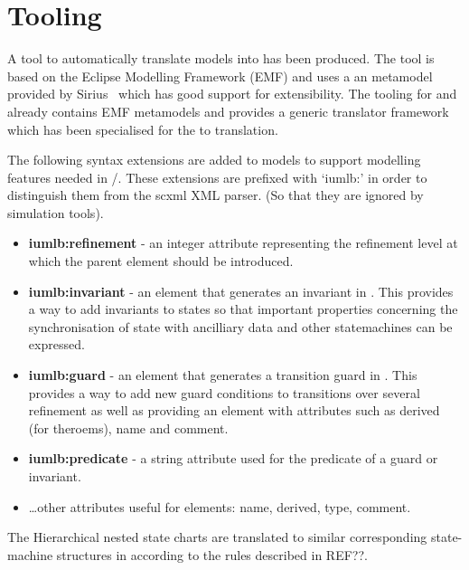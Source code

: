
\section{Tooling}
\label{sec:tooling}


A tool to automatically translate \SCXML models into \iUMLB has been produced. The tool is based on the Eclipse Modelling Framework (EMF) and uses a an \SCXML metamodel provided by Sirius~\cite{siriuswebsite} which has good support for extensibility. The tooling for \iUMLB and \EventB already contains EMF metamodels and provides a generic translator framework which has been specialised for the \SCXML to \iUMLB translation.  
 
The following syntax extensions are added to \SCXML models to support modelling features needed in \iUMLB/\EventB. These extensions are prefixed with `iumlb:' in order to distinguish them from the scxml XML parser. (So that they are ignored by \SCXML simulation tools). 
\begin{itemize}
	\item \textbf{iumlb:refinement} - an integer attribute representing the refinement level at which the parent element should be introduced.
	\item \textbf{iumlb:invariant} - an element that generates an invariant in \iUMLB. This provides a way to add invariants to states so that important properties concerning the synchronisation of state with ancilliary data and other statemachines can be expressed.
	\item \textbf{iumlb:guard} - an element that generates a transition guard in \iUMLB. 
	This provides a way to add new guard conditions to transitions over several refinement as well as providing an element with attributes such as derived (for \EventB theroems), name and comment.
	\item \textbf{iumlb:predicate} - a string attribute used for the predicate of a guard or invariant.
	\item \ldots other attributes useful for \iUMLB elements: name, derived, type, comment.
\end{itemize}

The 
Hierarchical nested state charts are translated to similar corresponding state-machine structures in \iUMLB according to the rules described in REF??. 

